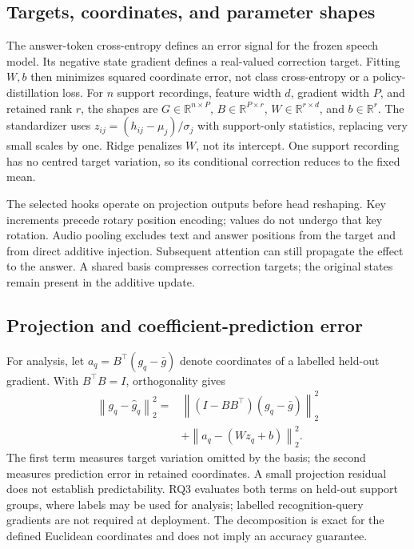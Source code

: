 \documentclass{article}
\newcommand{\R}{\mathbb R}
\newcommand{\norm}[1]{\left\lVert#1\right\rVert}
\begin{document}
\subsection{Targets, coordinates, and parameter shapes}
The answer-token cross-entropy defines an error signal for the frozen speech model. Its negative state gradient defines a real-valued correction target. Fitting $W,b$ then minimizes squared coordinate error, not class cross-entropy or a policy-distillation loss. For $n$ support recordings, feature width $d$, gradient width $P$, and retained rank $r$, the shapes are $G\in\R^{n\times P}$, $B\in\R^{P\times r}$, $W\in\R^{r\times d}$, and $b\in\R^r$. The standardizer uses $z_{ij}=(h_{ij}-\mu_j)/\sigma_j$ with support-only statistics, replacing very small scales by one. Ridge penalizes $W$, not its intercept. One support recording has no centred target variation, so its conditional correction reduces to the fixed mean.

The selected hooks operate on projection outputs before head reshaping. Key increments precede rotary position encoding; values do not undergo that key rotation. Audio pooling excludes text and answer positions from the target and from direct additive injection. Subsequent attention can still propagate the effect to the answer. A shared basis compresses correction targets; the original states remain present in the additive update.

\subsection{Projection and coefficient-prediction error}
\label{app:predictability}
For analysis, let $a_q=B^\top(g_q-\bar g)$ denote coordinates of a labelled held-out gradient. With $B^\top B=I$, orthogonality gives
\begin{equation}
\begin{aligned}
\norm{g_q-\widehat g_q}_2^2
={}&\norm{(I-BB^\top)(g_q-\bar g)}_2^2\\
&+\norm{a_q-(Wz_q+b)}_2^2.
\end{aligned}
\label{eq:decomposition}
\end{equation}
The first term measures target variation omitted by the basis; the second measures prediction error in retained coordinates. A small projection residual does not establish predictability. RQ3 evaluates both terms on held-out support groups, where labels may be used for analysis; labelled recognition-query gradients are not required at deployment. The decomposition is exact for the defined Euclidean coordinates and does not imply an accuracy guarantee.
\end{document}
